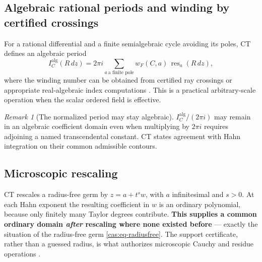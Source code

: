 \documentclass[11pt,letterpaper]{article}
\numberwithin{equation}{section}
\theoremstyle{definition}
\theoremstyle{remark}
\newtheorem{remark}[theorem]{Remark}
\newcommand{\res}{\operatorname{res}}
\begin{document}
\subsection{Algebraic rational periods and winding by certified crossings}
\label{cas:sub-periods}
For a rational differential and a finite semialgebraic cycle avoiding its poles,
CT defines an algebraic period
\begin{equation}\label{cas:eq-algebraicperiod}
 I_C^{\mathrm{alg}}(R\,dz)
 =2\pi i\sum_{a\ \text{a finite pole}}w_F(C,a)\,\res_a(R\,dz),
\end{equation}
where the winding number can be obtained from certified ray crossings or
appropriate real-algebraic index computations \cite{cas:SourceCT}. This is a
practical arbitrary-scale operation when the scalar ordered field is effective.

\begin{remark}[The normalized period may stay algebraic]\label{cas:rem-period}
$I_C^{\mathrm{alg}}/(2\pi i)$ may remain in an algebraic coefficient domain even
when multiplying by $2\pi i$ requires adjoining a named transcendental constant.
CT states agreement with Hahn integration on their common admissible contours.
\end{remark}

\subsection{Microscopic rescaling}
\label{cas:sub-rescaling}
CT rescales a radius-free germ by $z=a+t^sw$, with $a$ infinitesimal and $s>0$.
At each Hahn exponent the resulting coefficient in $w$ is an ordinary
polynomial, because only finitely many Taylor degrees contribute. \textbf{This
supplies a common ordinary domain \emph{after} rescaling where none existed
before} --- exactly the situation of the radius-free germ
\eqref{cas:eq-radiusfree}. The support certificate, rather than a guessed
radius, is what authorizes microscopic Cauchy and residue operations
\cite{cas:SourceCT}.
\end{document}
